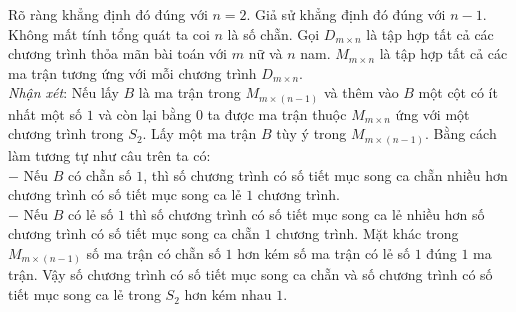 \begin{bt}[VMO 2015]
{\begin{enumerate}
			Rõ ràng khẳng định đó đúng với $n=2$. Giả sử khẳng định đó đúng với $n-1$. Không mất tính tổng quát ta coi $n$ là số chẵn. Gọi $D_{m \times n}$ là tập hợp tất cả các chương trình thỏa mãn bài toán với $m$ nữ và $n$ nam. $M_{m \times n}$ là tập hợp tất cả các ma trận tương ứng với mỗi chương trình $D_{m \times n}$. \\
			\textit{Nhận xét}: Nếu lấy $B$ là ma trận trong $M_{m \times (n-1)}$ và thêm vào $B$ một cột có ít nhất một số $1$ và còn lại bằng $0$ ta được ma trận thuộc $M_{m \times n}$ ứng với một chương trình trong $S_2$. Lấy một ma trận $B$ tùy ý trong $M_{m \times (n-1)}$. Bằng cách làm tương tự như câu trên ta có: \\
			$-$ Nếu $B$ có chẵn số $1$, thì số chương trình có số tiết mục song ca chẵn nhiều hơn chương trình có số tiết mục song ca lẻ $1$ chương trình. \\
			$-$ Nếu $B$ có lẻ số $1$ thì số chương trình có số tiết mục song ca lẻ nhiều hơn số chương trình có số tiết mục song ca chẵn $1$ chương trình. Mặt khác trong $M_{m \times (n-1)}$ số ma trận có chẵn số $1$ hơn kém số ma trận có lẻ số $1$ đúng $1$ ma trận. Vậy số chương trình có số tiết mục song ca chẵn và số chương trình có số tiết mục song ca lẻ trong $S_2$ hơn kém nhau $1$. 
			
		\end{enumerate}
	}
\end{bt}

